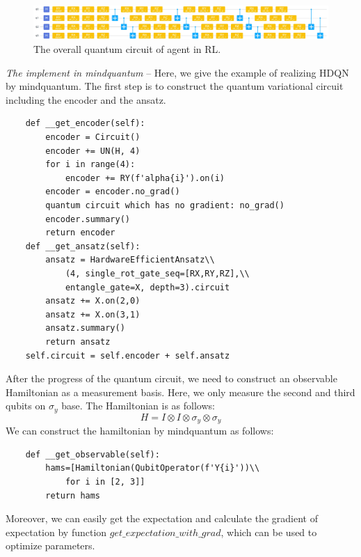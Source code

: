 \begin{figure}[ht]
  \centering
  \includegraphics[scale=0.5]{tex/5.4.5_RL/Circuit.png}
  \caption{\label{Agent_qc} The overall quantum circuit of agent in RL.}
\end{figure}

\textit{The implement in mindquantum} -- Here, we give the example of realizing HDQN by mindquantum. The first step is to construct the quantum variational circuit including the encoder and the ansatz.
\begin{lstlisting}
    def __get_encoder(self):
        encoder = Circuit()                                  
        encoder += UN(H, 4)                                  
        for i in range(4):                                   
            encoder += RY(f'alpha{i}').on(i)                  
        encoder = encoder.no_grad()                           
        quantum circuit which has no gradient: no_grad()
        encoder.summary()                                    
        return encoder
    def __get_ansatz(self):
        ansatz = HardwareEfficientAnsatz\\
            (4, single_rot_gate_seq=[RX,RY,RZ],\\
            entangle_gate=X, depth=3).circuit     
        ansatz += X.on(2,0)
        ansatz += X.on(3,1)
        ansatz.summary()                                                                              
        return ansatz
    self.circuit = self.encoder + self.ansatz
\end{lstlisting}

After the progress of the quantum circuit, we need to construct an observable Hamiltonian as a measurement basis. Here, we only measure the second and third qubits on $\sigma_y$ base. The Hamiltonian is as follows:
\begin{equation}
    H=I\otimes I\otimes\sigma_y\otimes\sigma_y
\end{equation}
We can construct the hamiltonian by mindquantum as follows:
\begin{lstlisting}
    def __get_observable(self):
        hams=[Hamiltonian(QubitOperator(f'Y{i}'))\\
            for i in [2, 3]] 
        return hams
\end{lstlisting}
Moreover, we can easily get the expectation and calculate the gradient of expectation by function $get\_expectation\_with\_grad$, which can be used to optimize parameters.

